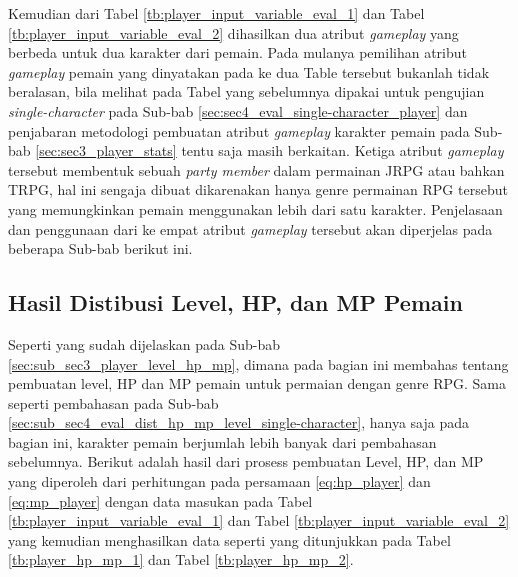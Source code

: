 Kemudian dari Tabel \ref{tb:player_input_variable_eval_1} dan Tabel \ref{tb:player_input_variable_eval_2} dihasilkan dua atribut \textit{gameplay} yang berbeda untuk dua karakter dari pemain. Pada mulanya pemilihan atribut \textit{gameplay} pemain yang dinyatakan pada ke dua Table tersebut bukanlah tidak beralasan, bila melihat pada Tabel yang sebelumnya dipakai untuk pengujian \textit{single-character} pada Sub-bab \ref{sec:sec4_eval_single-character_player} dan penjabaran metodologi pembuatan atribut \textit{gameplay} karakter pemain pada Sub-bab \ref{sec:sec3_player_stats} tentu saja masih berkaitan. Ketiga atribut \textit{gameplay} tersebut membentuk sebuah \textit{party member} dalam permainan JRPG atau bahkan TRPG, hal ini sengaja dibuat dikarenakan hanya genre permainan RPG tersebut yang memungkinkan pemain menggunakan lebih dari satu karakter. Penjelasaan dan penggunaan dari ke empat atribut \textit{gameplay} tersebut akan diperjelas pada beberapa Sub-bab berikut ini.
\vspace{1ex}

\subsection{Hasil Distibusi Level, HP, dan MP Pemain}
\label{sec:sub_sec4_eval_dist_hp_mp_level_multi-character}
\vspace{1ex}

Seperti yang sudah dijelaskan pada Sub-bab \ref{sec:sub_sec3_player_level_hp_mp}, dimana pada bagian ini membahas tentang pembuatan level, HP dan MP pemain untuk permaian dengan genre RPG. Sama seperti pembahasan pada Sub-bab \ref{sec:sub_sec4_eval_dist_hp_mp_level_single-character}, hanya saja pada bagian ini, karakter pemain berjumlah lebih banyak dari pembahasan sebelumnya. Berikut adalah hasil dari prosess pembuatan Level, HP, dan MP yang diperoleh dari perhitungan pada persamaan \ref{eq:hp_player} dan \ref{eq:mp_player} dengan data masukan pada Tabel \ref{tb:player_input_variable_eval_1} dan Tabel \ref{tb:player_input_variable_eval_2} yang kemudian menghasilkan data seperti yang ditunjukkan pada Tabel \ref{tb:player_hp_mp_1} dan Tabel \ref{tb:player_hp_mp_2}.
\vspace{-1ex}

